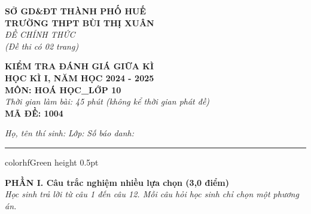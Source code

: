 \documentclass[11pt,a4paper]{article}
\begin{document}
\begin{minipage}[t]{0.48\textwidth}
\textbf{SỞ GD\&ĐT THÀNH PHỐ HUẾ}\\
\textbf{TRƯỜNG THPT BÙI THỊ XUÂN}\\
\textit{ĐỀ CHÍNH THỨC}\\
\textit{(Đề thi có 02 trang)}
\end{minipage}
\hfill
\begin{minipage}[t]{0.48\textwidth}
\raggedleft
\textbf{\color{hfRed}KIỂM TRA ĐÁNH GIÁ GIỮA KÌ}\\
\textbf{HỌC KÌ I, NĂM HỌC 2024 - 2025}\\
\textbf{MÔN: HOÁ HỌC\_LỚP 10}\\
\textit{Thời gian làm bài: 45 phút (không kể thời gian phát đề)}\\
\textbf{MÃ ĐỀ: 1004}
\end{minipage}

\vspace{4pt}
\noindent
\textit{Họ, tên thí sinh:} \dotfill \textit{Lớp:} \dotfill \textit{Số báo danh:} \dotfill

\vspace{3pt}
\hrule color{hfGreen} height 0.5pt

\vspace{4pt}
\noindent
{\color{mainGreen}\textbf{\large PHẦN I. Câu trắc nghiệm nhiều lựa chọn (3,0 điểm)}}\\
\textit{\small Học sinh trả lời từ câu 1 đến câu 12. Mỗi câu hỏi học sinh chỉ chọn một phương án.}
\vspace{2pt}
\end{document}
